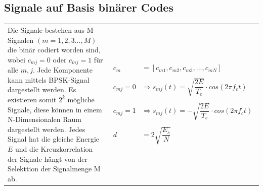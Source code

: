 \subsection{Signale auf Basis binärer Codes}
\begin{tabular}{ll}
 \addtolength{\jot}{2mm}
 \parbox{5cm}{Die Signale bestehen aus M-Signalen $(m = 1,2,3...,M)$ die binär codiert worden sind, wobei $c_{mj} = 0$ oder $c_{mj} = 1$ für alle $m,j$. Jede Komponente kann mittels BPSK-Signal dargestellt werden. Es existieren somit $2^k$ mögliche Signale, diese können in einem N-Dimensionalen Raum dargestellt werden. Jedes Signal hat die gleiche Energie $E$ und die Kreuzkorrelation der Signale hängt von der Selekttion der Signalmenge M ab.
}&
 \parbox{8cm}{
 \begin{eqnarray*}
c_m &= \left[ c_{m1}, c_{m2}, c_{m3}, ... , c_{mN} \right] \\
~&\\
c_{mj} = 0 &\Rightarrow s_{mj}(t) = \sqrt{\dfrac{2E}{T_e}} \cdot cos (2\pi f_c t)\\
~&\\
c_{mj} = 1 &\Rightarrow s_{mj}(t) = - \sqrt{\dfrac{2E}{T_e}} \cdot cos (2\pi f_c t)\\
~&\\
d &= 2 \sqrt{\dfrac{E_s}{N}}
 \end{eqnarray*}
 }
\end{tabular}\\~
\vfill\columnbreak

